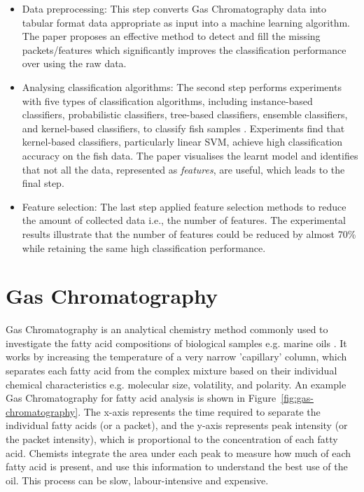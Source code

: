 \documentclass[runningheads]{llncs}
\begin{document}
\begin{itemize}
  \item Data preprocessing: This step converts Gas Chromatography data into tabular format data appropriate as input into a machine learning algorithm.
        The paper proposes an effective method to detect and fill the missing packets/features which significantly improves the classification performance over using the raw data.
  \item Analysing classification algorithms: The second step performs experiments with five types of classification algorithms, including instance-based classifiers, probabilistic classifiers, tree-based classifiers, ensemble classifiers, and kernel-based classifiers, to classify fish samples \cite{cortes1995support,fix1989discriminatory,hand2001idiot,ho1995random,loh2011classification}.
        Experiments find that kernel-based classifiers, particularly linear SVM, achieve high classification accuracy on the fish data. 
        The paper visualises the learnt model and identifies that not all the data, represented as \textit{features}, are useful, which leads to the final step.
  \item Feature selection: The last step applied feature selection methods to reduce the amount of collected data i.e., the number of features.
        The experimental results illustrate that the number of features could be reduced by almost 70\% while retaining the same high classification performance.
\end{itemize}

\section{Gas Chromatography}

Gas Chromatography is an analytical chemistry method commonly used to investigate the fatty acid compositions of biological samples e.g. marine oils \cite{eder1995gas,restek2018high}. 
It works by increasing the temperature of a very narrow 'capillary' column, which separates each fatty acid from the complex mixture based on their individual chemical characteristics e.g. molecular size, volatility, and polarity. 
An example Gas Chromatography for fatty acid analysis is shown in Figure~\ref{fig:gas-chromatography}. 
The x-axis represents the time required to separate the individual fatty acids (or a packet), and the y-axis represents peak intensity (or the packet intensity), which is proportional to the concentration of each fatty acid. 
Chemists integrate the area under each peak to measure how much of each fatty acid is present, and use this information to understand the best use of the oil. 
This process can be slow, labour-intensive and expensive.
\end{document}
